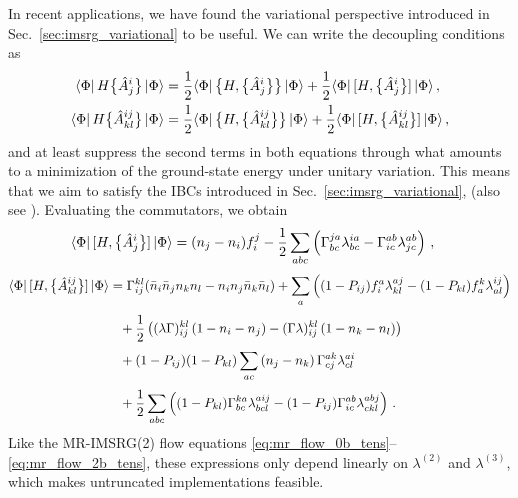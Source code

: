 {In recent applications, we have found the variational perspective
introduced in Sec.~\ref{sec:imsrg_variational} to be useful. We
can write the decoupling conditions as
\begin{align}
  \langle{\Phi}|\,{H\big\{\hat{A}^{i}_{j}\big\}}\,|{\Phi}\rangle 
    &= \frac{1}{2}\langle{\Phi}|\,{ \big\{ {H}, {\big\{\hat{A}^{i}_{j}\big\}} \big\} }\,|{\Phi}\rangle 
    + \frac{1}{2}\langle{\Phi}|\,{[{H},{\big\{\hat{A}^{i}_{j}\big\}}]}\,|{\Phi}\rangle\,,\\
  \langle{\Phi}|\,{H\big\{\hat{A}^{ij}_{kl}\big\}}\,|{\Phi}\rangle 
    &= \frac{1}{2}\langle{\Phi}|\,{ \big\{ {H}, {\big\{\hat{A}^{ij}_{kl}\big\}} \big\} }\,|{\Phi}\rangle 
    + \frac{1}{2}\langle{\Phi}|\,{[{H},{\big\{\hat{A}^{ij}_{kl}\big\}}]}\,|{\Phi}\rangle\,,
\end{align}
and at least suppress the second terms in both equations through what 
amounts to a minimization of the ground-state energy under unitary variation. 
This means that we aim to satisfy the IBCs introduced in Sec.~\ref{sec:imsrg_variational}, 
(also see \cite{Mukherjee:2001uq,Kutzelnigg:2002kx,Kutzelnigg:2004vn,Kutzelnigg:2004ys}).
Evaluating the commutators, we obtain
\begin{align}
  \langle{\Phi}|\,{[{H},{\big\{\hat{A}^{i}_{j}\big\}}]}\,|{\Phi}\rangle
    &=(n_j-n_i)f^{j}_{i}-\frac{1}{2}\sum_{abc}\left(  
     \Gamma^{ja}_{bc}\lambda^{ia}_{bc}
    -\Gamma^{ab}_{ic}\lambda^{ab}_{jc}
    \right)\,,
\end{align}
% 
\begin{align}
  \dmatrixe{\Phi}{\comm{H}{\nord{\AO^{ij}_{kl}}}}%
  &=
    \Gamma^{kl}_{ij}(\nn_i\nn_jn_kn_l - n_in_j\nn_k\nn_l)
  +\sum_{a}
     \left(
     (1-P_{ij})f^{a}_{i}\lambda^{aj}_{kl}
    -(1-P_{kl})f^{k}_{a}\lambda^{ij}_{al}
    \right)
    \notag\\[3pt]
% 
  &\hphantom{=}
    +\frac{1}{2}\left(
      (\lambda\Gamma)^{kl}_{ij}\left(1-n_i-n_j\right)
      -(\Gamma\lambda)^{kl}_{ij}\left(1-n_k-n_l\right)
    \right)
  \notag\\[3pt]
%
  &\hphantom{=}
    +(1-P_{ij})(1-P_{kl})\sum_{ac}
       \left(n_j-n_k\right)\Gamma^{ak}_{cj}\lambda^{ai}_{cl}
    \notag\\[3pt]
% 
  &\hphantom{=}
    +\frac{1}{2}\sum_{abc}\left(
       (1-P_{kl})\Gamma^{ka}_{bc}\lambda^{aij}_{bcl} 
      -(1-P_{ij})\Gamma^{ab}_{ic}\lambda^{abj}_{ckl} 
    \right)\,.
%   
\end{align}
Like the MR-IMSRG(2) flow equations \eqref{eq:mr_flow_0b_tens}--\eqref{eq:mr_flow_2b_tens},
these expressions only depend linearly on $\lambda^{(2)}$ and $\lambda^{(3)}$,
which makes untruncated implementations feasible.

}
